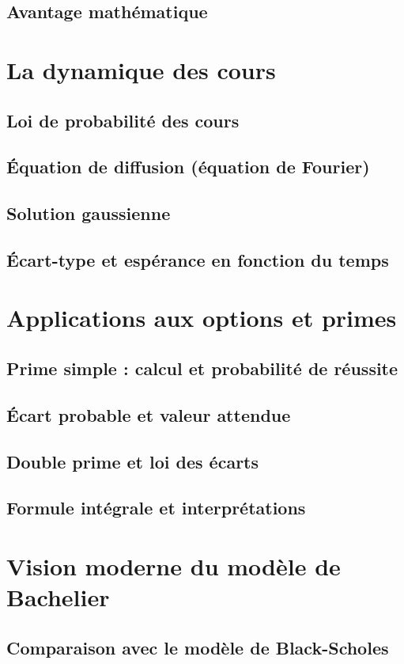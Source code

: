 \documentclass[12pt,a4paper]{article}
\begin{document}
\subsection{Avantage mathématique}

\section{La dynamique des cours}
\subsection{Loi de probabilité des cours}
\subsection{Équation de diffusion (équation de Fourier)}
\subsection{Solution gaussienne}
\subsection{Écart-type et espérance en fonction du temps}

\section{Applications aux options et primes}
\subsection{Prime simple : calcul et probabilité de réussite}
\subsection{Écart probable et valeur attendue}
\subsection{Double prime et loi des écarts}
\subsection{Formule intégrale et interprétations}

\section{Vision moderne du modèle de Bachelier}
\subsection{Comparaison avec le modèle de Black-Scholes}
\end{document}
